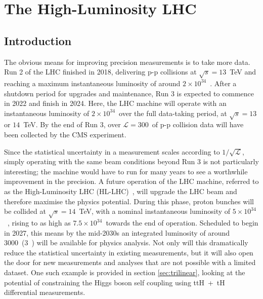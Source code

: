 \chapter{The High-Luminosity LHC}
\label{chap:hllhc}

\section{Introduction}
The obvious means for improving precision measurements is to take more data. Run 2 of the LHC finished in 2018, delivering p-p collisions at $\sqrt{s}=13$~TeV and reaching a maximum instantaneous luminosity of around $2\times10^{34}$~\lumi. After a shutdown period for upgrades and maintenance, Run 3 is expected to commence in 2022 and finish in 2024. Here, the LHC machine will operate with an instantaneous luminosity of $2\times10^{34}$~\lumi over the full data-taking period, at $\sqrt{s}=13$ or $14$~TeV. By the end of Run 3, over $\mathcal{L}=300$~\fbinv of p-p collision data will have been collected by the CMS experiment.

Since the statistical uncertainty in a measurement scales according to $1/\sqrt{\mathcal{L}}$, simply operating with the same beam conditions beyond Run 3 is not particularly interesting; the machine would have to run for many years to see a worthwhile improvement in the precision. A future operation of the LHC machine, referred to as the High-Luminosity LHC (HL-LHC)~\cite{ApollinariG.:2017ojx}, will upgrade the LHC beam and therefore maximise the physics potential. During this phase, proton bunches will be collided at $\sqrt{s}=14$~TeV, with a nominal instantaneous luminosity of $5\times10^{34}$~\lumi, rising to as high as $7.5\times10^{34}$~\lumi towards the end of operation. Scheduled to begin in 2027, this means by the mid-2030s an integrated luminosity of around 3000~\fbinv (3~\abinv) will be available for physics analysis. Not only will this dramatically reduce the statistical uncertainty in existing measurements, but it will also open the door for new measurements and analyses that are not possible with a limited dataset. One such example is provided in section \ref{sec:trilinear}, looking at the potential of constraining the Higgs boson self coupling using ttH~+~tH differential measurements.

